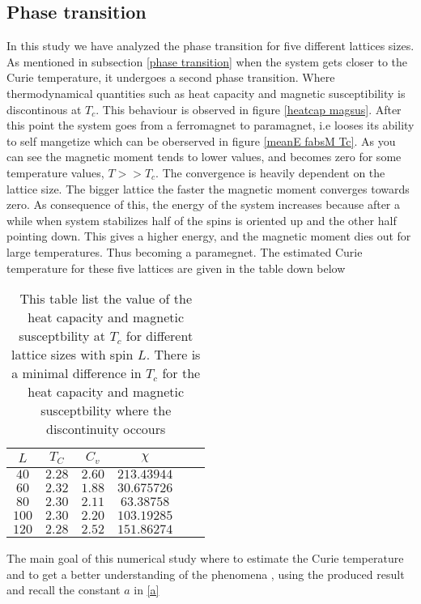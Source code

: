 \documentclass[a4paper, 10pt]{article}
\begin{document}
\subsection{Phase transition \label{ppp}} In this study we have analyzed the phase transition for five different lattices sizes.
As mentioned in subsection \eqref{phase transition} when the system gets closer to the Curie temperature, it undergoes a second phase transition.
Where thermodynamical quantities such as heat capacity and magnetic susceptibility is discontinous at $T_{c}$. This behaviour is observed in figure
\eqref{heatcap magsus}. After this point the system goes from
a ferromagnet to paramagnet, i.e looses its ability to self mangetize which can be oberserved in figure \eqref{meanE fabsM Tc}.
As you can see the magnetic moment tends to lower values, and becomes zero for some temperature values, $T >> T_{c}$. The convergence is heavily dependent on the lattice size. The
bigger lattice the faster the magnetic moment converges towards zero. As consequence of this, the energy of the system increases because
after a while when system stabilizes half of the spins is oriented up and the other half pointing down. This gives a higher energy, and the magnetic moment dies out
for large temperatures. Thus becoming a paramegnet. The estimated Curie temperature for these
five lattices are given in the table down below
\begin{table}[H]
  \centering
  \begin{tabular}{cccccc}\toprule
    $L$ & $T_{C}$ & $C_{v}$ & $\chi$ &
    \\ \midrule
    $40$ &  $2.28$ & $2.60$ & $213.43944$ \\
    $60$ &  $2.32$ & $1.88$ & $30.675726$ \\
    $80$ &  $2.30$ & $2.11$ & $63.38758$ \\
    $100$&  $2.30$ & $2.20$ & $103.19285$ \\
    $120$&  $2.28$ & $2.52$ & $151.86274$\\
    \bottomrule
  \end{tabular}
  \caption{This table list the value of the heat capacity and magnetic
  susceptbility at $T_{c}$ for different lattice sizes with spin $L$.
  There is a minimal difference in $T_{c}$ for the heat capacity and magnetic susceptbility
  where the discontinuity occours}
  \label{tabell}
\end{table}
The main goal of this numerical study where to estimate the Curie temperature and to get a better understanding of the phenomena
, using the produced result and recall the constant $a$ in \eqref{a}
\end{document}
